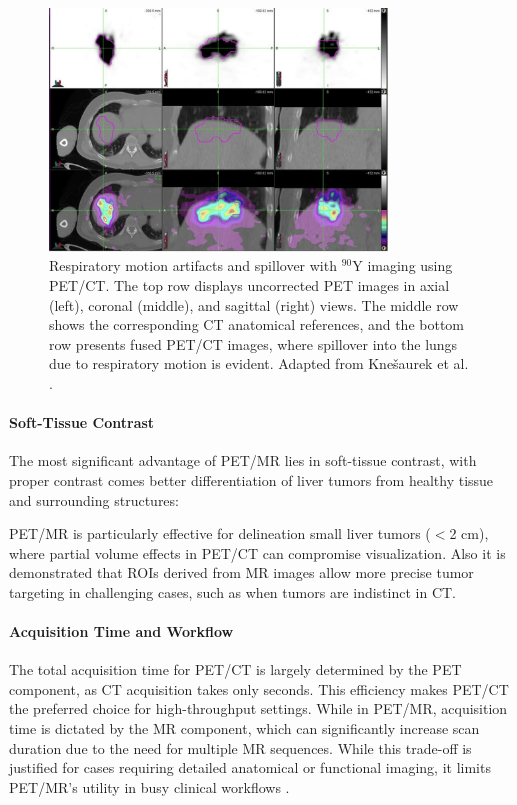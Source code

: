 \begin{figure}[ht]
	\centering
	\includegraphics[width=0.8\textwidth]{assets/Respiratory_Motion_Artifacts.png} 
	\caption{Respiratory motion artifacts and spillover with \(^{90}\text{Y}\) imaging using PET/CT. The top row displays uncorrected PET images in axial (left), coronal (middle), and sagittal (right) views. The middle row shows the corresponding CT anatomical references, and the bottom row presents fused PET/CT images, where spillover into the lungs due to respiratory motion is evident. Adapted from Knešaurek et al. \cite{knesaurek2018}.}
	\label{fig:respiratory_motion_artifacts}
\end{figure}



\paragraph{Soft-Tissue Contrast}

The most significant advantage of PET/MR lies in soft-tissue contrast, with proper contrast comes better differentiation of liver tumors from healthy tissue and surrounding structures:

PET/MR is particularly effective for delineation small liver tumors ($<$2 cm), where partial volume effects in PET/CT can compromise visualization. \cite{knesaurek2018} Also it is demonstrated that ROIs derived from MR images allow more precise tumor targeting in challenging cases, such as when tumors are indistinct in CT. %


\paragraph{Acquisition Time and Workflow}

The total acquisition time for PET/CT is largely determined by the PET component, as CT acquisition takes only seconds. This efficiency makes PET/CT the preferred choice for high-throughput settings\cite{knesaurek2018}.
While in PET/MR, acquisition time is dictated by the MR component, which can significantly increase scan duration due to the need for multiple MR sequences. %
While this trade-off is justified for cases requiring detailed anatomical or functional imaging, it limits PET/MR’s utility in busy clinical workflows \cite{knesaurek2018}.

